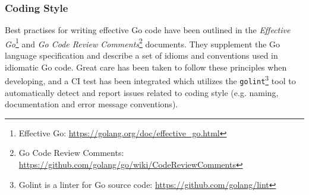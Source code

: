
\subsubsection{Coding Style}

Best practises for writing effective Go code have been outlined in the \textit{Effective Go}\footnote{Effective Go: \url{https://golang.org/doc/effective_go.html}} and \textit{Go Code Review Comments}\footnote{Go Code Review Comments: \url{https://github.com/golang/go/wiki/CodeReviewComments}} documents. They supplement the Go language specification and describe a set of idioms and conventions used in idiomatic Go code. Great care has been taken to follow these principles when developing, and a CI test has been integrated which utilizes the \texttt{golint}\footnote{Golint is a linter for Go source code: \url{https://github.com/golang/lint}} tool to automatically detect and report issues related to coding style (e.g. naming, documentation and error message conventions).
